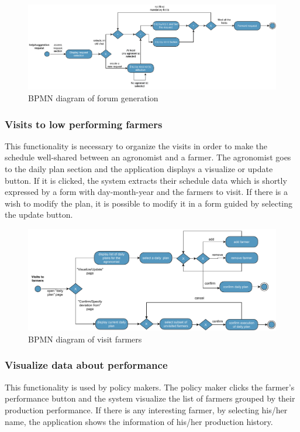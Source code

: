 \begin{figure}[H]
	\centering
    \includegraphics[width=\textwidth]{Images/BPMN/help-suggestion-request.pdf}
	\caption{\label{fig:bpmn_forum_generation}BPMN diagram of forum generation}
\end{figure}


\subsubsection{Visits to low performing farmers}
This functionality is necessary to organize the visits in order to make the schedule well-shared between an agronomist and a farmer. The agronomist goes to the daily plan section and the application displays a visualize or update button. If it is clicked, the system extracts their schedule data which is shortly expressed by a form with day-month-year and the farmers to visit.
If there is a wish to modify the plan, it is possible to modify it in a form guided by selecting the update button.

\begin{figure}[H]
	\centering
    \includegraphics[width=\textwidth]{Images/BPMN/visit.pdf}
	\caption{\label{fig:bpmn_visit}BPMN diagram of visit farmers}
\end{figure}


\subsubsection{Visualize data about performance}
This functionality is used by policy makers. The policy maker clicks the farmer's performance button and the system visualize the list of farmers grouped by their production performance. If there is any interesting farmer, by selecting his/her name, the application shows the information of his/her production history.

